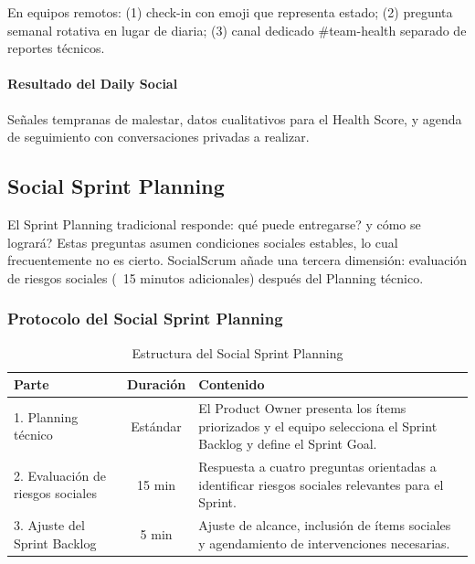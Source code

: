 En equipos remotos: (1) check-in con emoji que representa estado; (2) pregunta semanal rotativa en lugar de diaria; (3) canal dedicado \#team-health separado de reportes técnicos.

\paragraph{Resultado del Daily Social}

Señales tempranas de malestar, datos cualitativos para el Health Score, y agenda de seguimiento con conversaciones privadas a realizar.

\subsection{Social Sprint Planning}

El Sprint Planning tradicional responde: \textquestiondown qué puede entregarse? y \textquestiondown cómo se logrará? Estas preguntas asumen condiciones sociales estables, lo cual frecuentemente no es cierto. SocialScrum añade una tercera dimensión: evaluación de riesgos sociales (~15 minutos adicionales) después del Planning técnico.

\subsubsection{Protocolo del Social Sprint Planning}

\begin{table}[h]
    \centering
    \small
    \begin{tabularx}{\textwidth}{|l|c|X|}
        \hline
        \textbf{Parte} & \textbf{Duración}                                                                                                 & \textbf{Contenido} \\
        \hline
        1. Planning técnico
                       & Estándar
                       & El Product Owner presenta los ítems priorizados y el equipo selecciona el Sprint Backlog y define el Sprint Goal.                      \\
        \hline
        2. Evaluación de riesgos sociales
                       & 15 min
                       & Respuesta a cuatro preguntas orientadas a identificar riesgos sociales relevantes para el Sprint.                                      \\
        \hline
        3. Ajuste del Sprint Backlog
                       & 5 min
                       & Ajuste de alcance, inclusión de ítems sociales y agendamiento de intervenciones necesarias.                                            \\
        \hline
    \end{tabularx}
    \caption{Estructura del Social Sprint Planning}
    \label{tab:planning-social-estructura}
\end{table}


